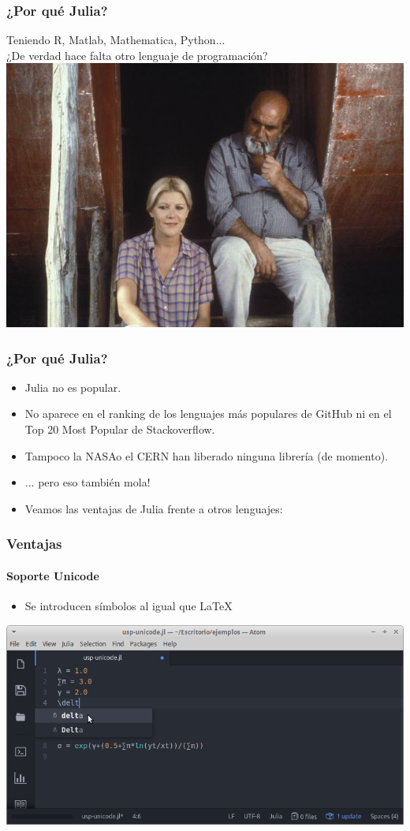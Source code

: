 \documentclass{beamer}
\begin{document}
\begin{frame}
\frametitle{¿Por qué Julia?}
\begin{center}
Teniendo R, Matlab, Mathematica, Python...\\
¿De verdad hace falta otro lenguaje de programación?\\[0.5cm]
\includegraphics{images/1316694066614.jpg}	
\end{center}
\end{frame}

\begin{frame}
\frametitle{¿Por qué Julia?}
\begin{itemize}
	\item Julia no es popular. 
	\item No aparece en el ranking de los lenguajes más populares de GitHub \footnotemark ni en el Top 20 Most Popular de Stackoverflow\footnotemark.
	\item Tampoco la NASA\footnotemark  o el CERN han liberado ninguna librería (de momento).
	\item ... pero eso también mola!
	\item Veamos las ventajas de Julia frente a otros lenguajes:
\end{itemize}
\end{frame}

\begin{frame}
\frametitle{Ventajas}
\framesubtitle{Soporte Unicode}
\begin{itemize}
	\item Se introducen símbolos al igual que \LaTeX
\end{itemize}
\includegraphics[scale=0.40]{images/julia-unicode}
\end{frame}
\end{document}
